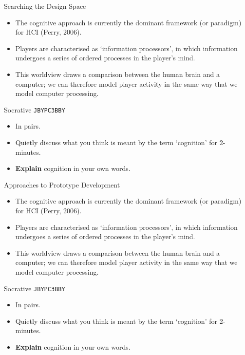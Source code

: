 \begin{frame}{Searching the Design Space}
	\begin{itemize}
		\item The cognitive approach is currently the dominant framework (or paradigm) for HCI (Perry, 2006).
		\item Players are characterised as `information processors', in which information undergoes a series of ordered processes
		in the player's mind.
		\item This worldview draws a comparison between the human brain and a computer; we can therefore model player activity in the same
		way that we model computer processing.
	\end{itemize}
\end{frame}

\begin{frame}[fragile]{Socrative \texttt{JBYPC3BBY}}
	\begin{itemize}
		\item In pairs.
		\item Quietly discuss what you think is meant by the term `cognition' for 2-minutes.
		\item \textbf{Explain} cognition in your own words.
	\end{itemize}
\end{frame}

\begin{frame}{Approaches to Prototype Development}
	\begin{itemize}
		\item The cognitive approach is currently the dominant framework (or paradigm) for HCI (Perry, 2006).
		\item Players are characterised as `information processors', in which information undergoes a series of ordered processes
		in the player's mind.
		\item This worldview draws a comparison between the human brain and a computer; we can therefore model player activity in the same
		way that we model computer processing.
	\end{itemize}
\end{frame}

\begin{frame}[fragile]{Socrative \texttt{JBYPC3BBY}}
	\begin{itemize}
		\item In pairs.
		\item Quietly discuss what you think is meant by the term `cognition' for 2-minutes.
		\item \textbf{Explain} cognition in your own words.
	\end{itemize}
\end{frame}

